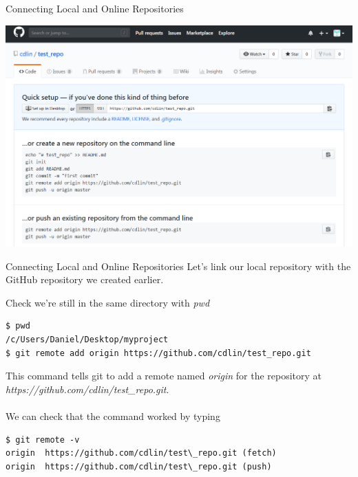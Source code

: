 \documentclass[11pt]{beamer}
\begin{document}
\begin{frame}[fragile]{Connecting Local and Online Repositories}
\begin{center}
\includegraphics[width=1.0\textwidth]{./auxfiles/github_command.png}
\end{center}
\end{frame}

\begin{frame}[fragile]{Connecting Local and Online Repositories}
Let's link our local repository with the GitHub repository we created earlier.

Check we're still in the same directory with \emph{pwd}
\begin{lstlisting}
$ pwd 
/c/Users/Daniel/Desktop/myproject
$ git remote add origin https://github.com/cdlin/test_repo.git
\end{lstlisting}
This command tells git to add a remote named \emph{origin} for the repository at \emph{https://github.com/cdlin/test\_repo.git}.\\~\\
We can check that the command worked by typing
\begin{lstlisting}[frame=single]
$ git remote -v
origin  https://github.com/cdlin/test\_repo.git (fetch)
origin  https://github.com/cdlin/test\_repo.git (push)
\end{lstlisting}
\end{frame}
\end{document}
